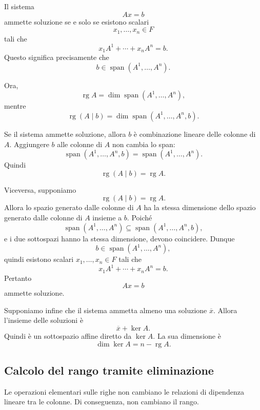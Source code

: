 \documentclass[a4paper]{article}
\begin{document}
\begin{snippetproof}{}
    Il sistema
    \[
        Ax=b
    \]
    ammette soluzione se e solo se esistono scalari
    \[
        x_1,\ldots,x_n\in F
    \]
    tali che
    \[
        x_1A^1+\cdots+x_nA^n=b.
    \]
    Questo significa precisamente che
    \[
        b\in\operatorname{span}(A^1,\ldots,A^n).
    \]

    Ora,
    \[
        \operatorname{rg}A
        =
        \dim\operatorname{span}(A^1,\ldots,A^n),
    \]
    mentre
    \[
        \operatorname{rg}(A\mid b)
        =
        \dim\operatorname{span}(A^1,\ldots,A^n,b).
    \]

    Se il sistema ammette soluzione, allora \(b\) è combinazione lineare delle colonne di \(A\). Aggiungere \(b\) alle colonne di \(A\) non cambia lo span:
    \[
        \operatorname{span}(A^1,\ldots,A^n,b)
        =
        \operatorname{span}(A^1,\ldots,A^n).
    \]
    Quindi
    \[
        \operatorname{rg}(A\mid b)=\operatorname{rg}A.
    \]

    Viceversa, supponiamo
    \[
        \operatorname{rg}(A\mid b)=\operatorname{rg}A.
    \]
    Allora lo spazio generato dalle colonne di \(A\) ha la stessa dimensione dello spazio generato dalle colonne di \(A\) insieme a \(b\). Poiché
    \[
        \operatorname{span}(A^1,\ldots,A^n)
        \subseteq
        \operatorname{span}(A^1,\ldots,A^n,b),
    \]
    e i due sottospazi hanno la stessa dimensione, devono coincidere. Dunque
    \[
        b\in\operatorname{span}(A^1,\ldots,A^n),
    \]
    quindi esistono scalari \(x_1,\ldots,x_n\in F\) tali che
    \[
        x_1A^1+\cdots+x_nA^n=b.
    \]
    Pertanto
    \[
        Ax=b
    \]
    ammette soluzione.

    Supponiamo infine che il sistema ammetta almeno una soluzione \(\overline{x}\). Allora l'insieme delle soluzioni è
    \[
        \overline{x}+\ker A.
    \]
    Quindi è un sottospazio affine diretto da \(\ker A\). La sua dimensione è
    \[
        \dim\ker A=n-\operatorname{rg}A.
    \]
\end{snippetproof}

\subsection{Calcolo del rango tramite eliminazione}

Le operazioni elementari sulle righe non cambiano le relazioni di dipendenza lineare tra le colonne. Di conseguenza, non cambiano il rango.
\end{document}
